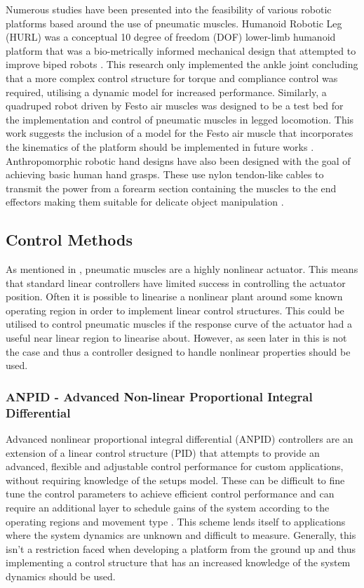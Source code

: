 \documentclass[11pt,a4paper]{article}
\begin{document}
Numerous studies have been presented into the feasibility of various robotic platforms based around the use of pneumatic muscles. Humanoid Robotic Leg (HURL) was a conceptual 10 degree of freedom (DOF) lower-limb humanoid platform that was a bio-metrically informed mechanical design that attempted to improve biped robots \cite{andrikopoulos_nikolakopoulos_2017}. This research only implemented the ankle joint concluding that a more complex control structure for torque and compliance control was required, utilising a dynamic model for increased performance. Similarly, a quadruped robot driven by Festo air muscles was designed to be a test bed for the implementation and control of pneumatic muscles in legged locomotion. This work suggests the inclusion of a model for the Festo air muscle that incorporates the kinematics of the platform should be implemented in future works \cite{aschenbeck_kern_bachmann_quinn}. Anthropomorphic robotic hand designs have also been designed with the goal of achieving basic human hand grasps. These use nylon tendon-like cables to transmit the power from a forearm section containing the muscles to the end effectors making them suitable for delicate object manipulation \cite{lau_chai_2012}.

\subsection{Control Methods}
\label{sub:control_methods}
As mentioned in , pneumatic muscles are a highly nonlinear actuator. This means that standard linear controllers have limited success in controlling the actuator position. Often it is possible to linearise a nonlinear plant around some known operating region in order to implement linear control structures. This could be utilised to control pneumatic muscles if the response curve of the actuator had a useful near linear region to linearise about. However, as seen later in  this is not the case and thus a controller designed to handle nonlinear properties should be used. 

\subsubsection{ANPID - Advanced Non-linear Proportional Integral Differential}
\label{sub:pid}
Advanced nonlinear proportional integral differential (ANPID) controllers are an extension of a linear control structure (PID) that attempts to provide an advanced, flexible and adjustable control performance for custom applications, without requiring knowledge of the setups model. These can be difficult to fine tune the control parameters to achieve efficient control performance and can require an additional layer to schedule gains of the system according to the operating regions and movement type \cite{andrikopoulos_nikolakopoulos_2017}. This scheme lends itself to applications where the system dynamics are unknown and difficult to measure. Generally, this isn't a restriction faced when developing a platform from the ground up and thus implementing a control structure that has an increased knowledge of the system dynamics should be used.
\end{document}
